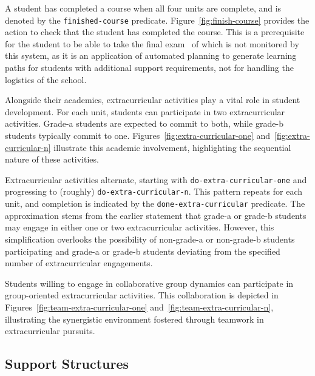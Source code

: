 


A student has completed a course when all four units are complete, and is denoted by the \texttt{finished-course} predicate. Figure~\ref{fig:finish-course} provides the action to check that the student has completed the course. This is a prerequisite for the student to be able to take the final exam \textemdash~of which is not monitored by this system, as it is an application of automated planning to generate learning paths for students with additional support requirements, not for handling the logistics of the school.



Alongside their academics, extracurricular activities play a vital role in student development. For each unit, students can participate in two extracurricular activities. Grade-a students are expected to commit to both, while grade-b students typically commit to one. Figures~\ref{fig:extra-curricular-one} and~\ref{fig:extra-curricular-n} illustrate this academic involvement, highlighting the sequential nature of these activities.




Extracurricular activities alternate, starting with \texttt{do-extra-curricular-one} and progressing to (roughly) \texttt{do-extra-curricular-n}. This pattern repeats for each unit, and completion is indicated by the \texttt{done-extra-curricular} predicate. The approximation stems from the earlier statement that grade-a or grade-b students may engage in either one or two extracurricular activities. However, this simplification overlooks the possibility of non-grade-a or non-grade-b students participating and grade-a or grade-b students deviating from the specified number of extracurricular engagements.

Students willing to engage in collaborative group dynamics can participate in group-oriented extracurricular activities. This collaboration is depicted in Figures~\ref{fig:team-extra-curricular-one} and~\ref{fig:team-extra-curricular-n}, illustrating the synergistic environment fostered through teamwork in extracurricular pursuits.




\subsection{Support Structures}







